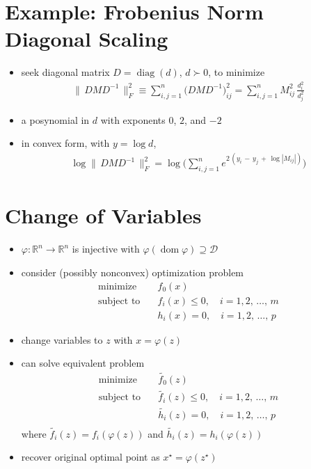 \documentclass[11pt]{extarticle}
\newcommand{\ds}{\displaystyle}
\DeclareMathOperator*{\dom}{dom}
\DeclareMathOperator*{\diag}{diag}
\theoremstyle{definition}
\begin{document}
\section*{Example: Frobenius Norm Diagonal Scaling}
\vspace{-2mm}
\begin{itemize}\setlength\itemsep{0em}
  \item seek diagonal matrix $\ds D = \diag(d)$, $d\succ 0$, to minimize 
    \vspace{-2mm}
    \begin{align*}
      \big\|\,DMD^{-1}\,\big\|_F^2 \equiv \sum_{i,j = 1}^n\big(DMD^{-1}\big)_{ij}^2 = \sum_{i,j = 1}^n M_{ij}^2\,\frac{d_i^2}{d_j^2} 
    \end{align*}
    \vspace{-5mm}
  \item a posynomial in $d$ with exponents $0$, $2$, and $-2$
  \item in convex form, with $\ds y = \log d$, 
    \vspace{-2mm}
    \begin{align*}
      \log\big\|\,DMD^{-1}\,\big\|_F^2 = \log\bigg(\sum_{i,j = 1}^n e^{2\,(y_i \,-\, y_j \,+\, \log|M_{ij}|)}\bigg) 
    \end{align*}
\end{itemize}

\newpage

\section*{Change of Variables}
\begin{itemize}
  \item $\ds\varphi:\mathbb{R}^n\to\mathbb{R}^n$ is injective with $\varphi(\dom\varphi)\supseteq\mathcal{D}$
  \item consider (possibly nonconvex) optimization problem
    \begin{align*}
      \text{minimize}\quad &f_0(x) \\
      \text{subject to}\quad &f_i(x)\leqslant 0, \quad i = 1, 2,\,\ldots,\,m \\
      \qquad\qquad &h_i(x) = 0, \quad i = 1, 2,\,\ldots,\,p
    \end{align*}
  \item change variables to $z$ with $\ds x = \varphi(z)$
  \item can solve equivalent problem
    \begin{align*}
      \text{minimize}\quad &\widetilde{f_0}(z) \\
      \text{subject to}\quad &\widetilde{f_i}(z)\leqslant 0, \quad i = 1, 2,\,\ldots,\,m \\
      \qquad\qquad &\widetilde{h_i}(z) = 0, \quad i = 1, 2,\,\ldots,\,p \\
    \end{align*}
    where $\ds\widetilde{f_i}(z) = f_i(\varphi(z))$ and $\ds\widetilde{h_i}(z) = h_i(\varphi(z))$
  \item recover original optimal point as $\ds x^\star = \varphi(z^\star)$
\end{itemize}
\end{document}
